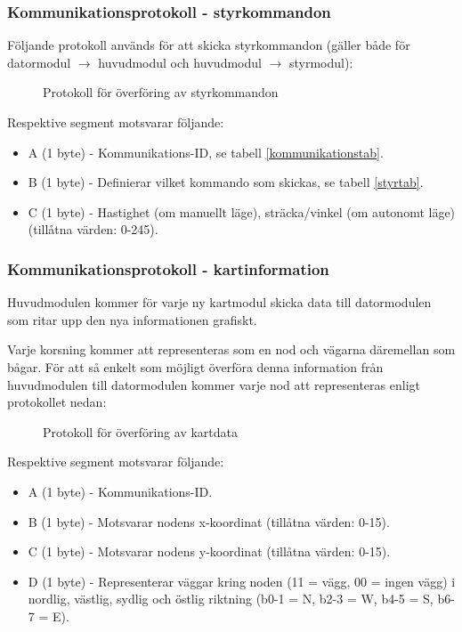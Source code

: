 \documentclass[11pt]{article}
\begin{document}
\begin{flushleft}
\subsubsection{Kommunikationsprotokoll - styrkommandon}
Följande protokoll används för att skicka styrkommandon (gäller både för datormodul $\rightarrow$ huvudmodul och huvudmodul $\rightarrow$ styrmodul):

\begin{figure}[htbp]
\centering
\noindent\resizebox{.8\linewidth}{!}{
	}
	\caption{Protokoll för överföring av styrkommandon\label{styrdata}}	
\end{figure}

Respektive segment motsvarar följande: 
\begin{itemize}
	\item A (1 byte) - Kommunikations-ID, se tabell \ref{kommunikationstab}.
	\item B (1 byte) - Definierar vilket kommando som skickas, se tabell \ref{styrtab}.
	\item C (1 byte) - Hastighet (om manuellt läge), sträcka/vinkel (om autonomt läge)(tillåtna värden: 0-245).
\end{itemize}

\subsubsection{Kommunikationsprotokoll - kartinformation}
Huvudmodulen kommer för varje ny kartmodul skicka data till datormodulen som ritar upp den nya informationen grafiskt. 

Varje korsning kommer att representeras som en nod och vägarna däremellan som bågar. För att så enkelt som möjligt överföra denna information från huvudmodulen till datormodulen kommer varje nod att representeras enligt protokollet nedan:

 \begin{figure}[H]
\centering
\noindent\resizebox{.8\linewidth}{!}{
	}
	\caption{Protokoll för överföring av kartdata \label{kartdata}}	
\end{figure} 

Respektive segment motsvarar följande: 
\begin{itemize}
	\item A (1 byte) - Kommunikations-ID.
	\item B (1 byte) - Motsvarar nodens x-koordinat (tillåtna värden: 0-15).
	\item C (1 byte) - Motsvarar nodens y-koordinat (tillåtna värden: 0-15).
	\item D (1 byte) - Representerar väggar kring noden (11 = vägg, 00 = ingen vägg) i nordlig, västlig, sydlig och östlig riktning (b0-1 = N, b2-3 = W, b4-5 = S, b6-7 = E).
\end{itemize}


\end{flushleft}
\end{document}
